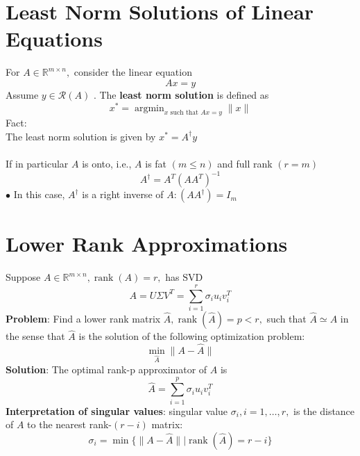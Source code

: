 \documentclass[10pt,a4paper,oneside]{article}
\begin{document}
\section{Least Norm Solutions of Linear Equations}
For $A \in \mathbb{R}^{m \times n},$ consider the linear equation
\[
Ax=y
\]
Assume $y \in \mathcal{R}(A)$ . The {\bfseries least norm solution} is defined as
\[
x^{*}=\operatorname{argmin}_{x \text { such that } A x=y}\|x\|
\]
Fact:\\
The least norm solution is given by $x^{*}=A^{\dagger} y$\\
\\
If in particular $A$ is onto, i.e., $A$ is fat $(m \leq n)$ and full rank $(r=m)$
\[
A^{\dagger}=A^{T}\left(A A^{T}\right)^{-1}
\]
$\bullet$ In this case, $A^{\dagger}$ is a right inverse of $A :\left(A A^{\dagger}\right)=I_{m}$
\section{Lower Rank Approximations}
Suppose $A \in \mathbb{R}^{m \times n}, \operatorname{rank}(A)=r,$ has $\mathrm{SVD}$
\[
A=U \Sigma V^{T}=\sum_{i=1}^{r} \sigma_{i} u_{i} v_{i}^{T}
\]
{\bfseries Problem}: Find a lower rank matrix $\hat{A}, \operatorname{rank}(\hat{A})=p<r,$ such that $\hat{A} \simeq A$ in the sense that $\hat{A}$ is the solution of the following optimization problem:
\[
\min _{\hat{A}}\|A-\hat{A}\|
\]
{\bfseries Solution}: The optimal rank-p approximator of $A$ is
\[
\hat{A}=\sum_{i=1}^{p} \sigma_{i} u_{i} v_{i}^{T}
\]
{\bfseries Interpretation of singular values}: singular value $\sigma_{i}, i=1, \ldots, r,$ is the distance of $A$ to the nearest rank-$(r-i)$ matrix:
\[
\sigma_{i}=\min \{\|A-\hat{A}\| | \operatorname{rank}(\hat{A})=r-i\}
\]
\end{document}
